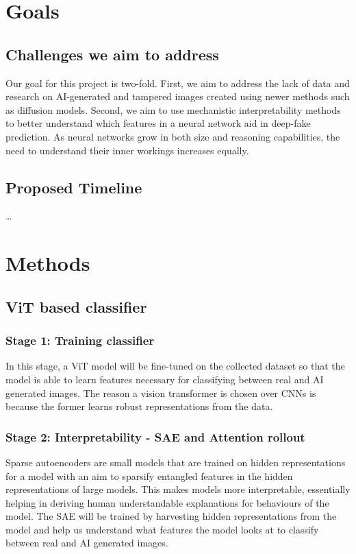 \documentclass[10pt,twocolumn,letterpaper]{article}
\begin{document}
\section{Goals}

\subsection{Challenges we aim to address}
Our goal for this project is two-fold. First, we aim to address the lack of data and research on AI-generated and tampered images created using newer methods such as diffusion models. Second, we aim to use mechanistic interpretability methods to better understand which features in a neural network aid in deep-fake prediction. As neural networks grow in both size and reasoning capabilities, the need to understand their inner workings increases equally.

\subsection{Proposed Timeline}
\ldots 

\section{Methods}
\subsection{ViT based classifier}
\subsubsection{Stage 1: Training classifier}
In this stage, a ViT model \cite{dosovitskiyImageWorth16x162021} will be fine-tuned on the collected dataset so that the model is able to learn features necessary for classifying between real and AI generated images. The reason a vision transformer is chosen over CNNs is because the former learns robust representations from the data.

\subsubsection{Stage 2: Interpretability - SAE and Attention rollout}
Sparse autoencoders are small models that are trained on hidden representations for a model with an aim to sparsify entangled features in the hidden representations of large models. This makes models more interpretable, essentially helping in deriving human understandable explanations for behaviours of the model. The SAE will be trained by harvesting hidden representations from the model and help us understand what features the model looks at to classify between real and AI generated images.
\end{document}
